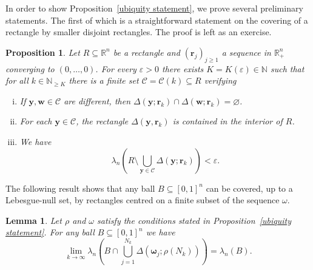 \documentclass{amsart}
\newtheorem{lemma}[theorem]{Lemma}
\newtheorem{proposition}[theorem]{Proposition}
\theoremstyle{definition}
\newcommand{\N}{\mathbb N}%
\newcommand{\0}{\mbf 0}%
\def\N{\mathbb N}
\begin{document}
In order to show Proposition~\ref{ubiquity statement}, we prove several preliminary statements. The first of which is a straightforward statement on the covering of a rectangle by smaller disjoint rectangles. The proof is left as an exercise. 
\begin{proposition}\label{Prop:AlmostCover}
Let $R\subseteq \mathbb{R}^n$ be a rectangle and $(\mathbf{r}_j)_{j\geq 1}$ a sequence in $\mathbb{R}_{+}^n$ converging to $(0,\ldots,0)$. For every $\varepsilon>0$ there exists $K=K(\varepsilon)\in\N$ such that for all $k\in \N_{\geq K}$ there is a finite set $\mathcal{C}=\mathcal{C}(k)\subseteq R$ verifying
\begin{enumerate}[i.]
\item If $\mathbf{y},\mathbf{w}\in\mathcal{C}$ are different, then $\Delta(\mathbf{y};\mathbf{r}_k)\cap\Delta(\mathbf{w};\mathbf{r}_k)=\varnothing$.
\item For each $\mathbf{y}\in\mathcal{C}$, the rectangle $\Delta(\mathbf{y},\mathbf{r}_k)$ is contained in the interior of $R$.
\item We have
\[
\lambda_n\left( R\setminus \bigcup_{\mathbf{y}\in\mathcal{C}} \Delta(\mathbf{y};\mathbf{r}_{k})\right)< \varepsilon.
\]
\end{enumerate}
\end{proposition}


The following result shows that any ball $B\subseteq [0,1]^{n}$ can be covered, up to a Lebesgue-null set, by rectangles centred on a finite subset of the sequence $\omega$.

\begin{lemma}\label{uniform dirichlet}
Let $\rho$ and $\omega$ satisfy the conditions stated in Proposition~\ref{ubiquity statement}. For any ball $B\subseteq [0,1]^{n}$ we have
\[
\lim_{k\to\infty}
\lambda_n\left( B\cap\bigcup_{j=1}^{N_k} \Delta(\boldsymbol{\omega}_j;\rho(N_k))\right)
=
\lambda_n(B).
\]
\end{lemma}
\end{document}
